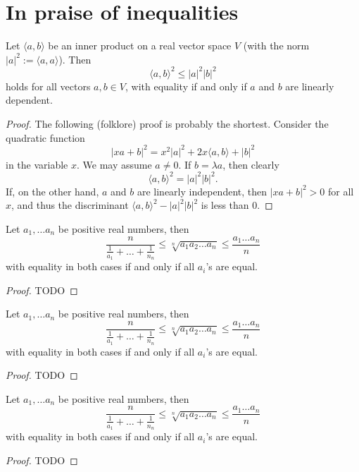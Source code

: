 \chapter{In praise of inequalities}

\begin{theorem}
  \label{ch20theoremI}
  \leanok
Let $\langle a, b \rangle$ be an inner product on a real vector space $V$ (with the norm $|a|^2 := \langle a, a \rangle$). Then
\[
\langle a, b \rangle^2 \leq |a|^2 |b|^2
\]
holds for all vectors $a, b \in V$, with equality if and only if $a$ and $b$ are linearly dependent.
\end{theorem}
\begin{proof}
  \leanok
The following (folklore) proof is probably the shortest. Consider the quadratic function
\[
|x a + b|^2 = x^2 |a|^2 + 2x \langle a, b \rangle + |b|^2
\]
in the variable $x$. We may assume $a \neq 0$. If $b = \lambda a$, then clearly
\[
\langle a, b \rangle^2 = |a|^2 |b|^2.
\]
If, on the other hand, $a$ and $b$ are linearly independent, then $|x a + b|^2 > 0$ for all $x$,
and thus the discriminant $\langle a, b \rangle^2 - |a|^2 |b|^2$ is less than 0.
\end{proof}

\begin{theorem}
  \label{ch20theoremIIproof1}
  Let $a_1, \dots a_n$ be positive real numbers, then
  \[
  \frac{n}{\frac{1}{a_1}+\dots+\frac{1}{n_n}} \le
    \sqrt[n]{a_1a_2\dots a_n} \le
    \frac{a_1\dots a_n}{n}
  \]
 with equality in both cases if and only if all $a_i$'s are equal.
\end{theorem}
 \begin{proof}
  TODO
\end{proof}

\begin{theorem}
  \label{ch20theoremIIproof2}
  Let $a_1, \dots a_n$ be positive real numbers, then
  \[
  \frac{n}{\frac{1}{a_1}+\dots+\frac{1}{n_n}} \le
    \sqrt[n]{a_1a_2\dots a_n} \le
    \frac{a_1\dots a_n}{n}
  \]
 with equality in both cases if and only if all $a_i$'s are equal.
\end{theorem}
 \begin{proof}
  TODO
\end{proof}

\begin{theorem}
  \label{ch20theoremIIproof3}
  Let $a_1, \dots a_n$ be positive real numbers, then
  \[
  \frac{n}{\frac{1}{a_1}+\dots+\frac{1}{n_n}} \le
    \sqrt[n]{a_1a_2\dots a_n} \le
    \frac{a_1\dots a_n}{n}
  \]
 with equality in both cases if and only if all $a_i$'s are equal.
\end{theorem}
 \begin{proof}
  TODO
\end{proof}

